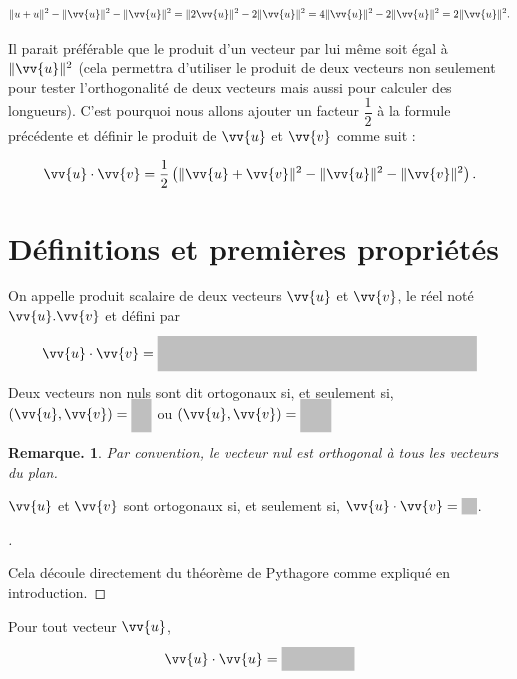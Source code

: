 \documentclass[12pt]{article}
\theoremstyle{break}
\newtheorem*{remark}{Remarque.}
\newenvironment{demo}[1][\proofname]{%
  \begin{proof}[#1]$ $\newline
  }{%
  \end{proof}
}
\begin{document}
$$
\|u+u\|^{2}-\|\vv{u}\|^{2}-\|\vv{u}\|^{2}=\|2 \vv{u}\|^{2}-2\|\vv{u}\|^{2}=4\|\vv{u}\|^{2}-2\|\vv{u}\|^{2}=2\|\vv{u}\|^{2} .
$$

Il parait préférable que le produit d'un vecteur par lui même soit égal à $\|\vv{u}\|^{2}$ (cela permettra d'utiliser le produit de deux vecteurs non seulement pour tester l'orthogonalité de deux vecteurs mais aussi pour calculer des longueurs). C'est pourquoi nous allons ajouter un facteur $\dfrac{1}{2}$ à la formule précédente et définir le produit de $\vv{u}$ et $\vv{v}$ comme suit :

$$
\vv{u} \cdot \vv{v}=\dfrac{1}{2}\left(\|\vv{u}+\vv{v}\|^{2}-\|\vv{u}\|^{2}-\|\vv{v}\|^{2}\right) .
$$

\newpage

\section{Définitions et premières propriétés}
\begin{definition}{}{}
  On appelle produit scalaire de deux vecteurs $\vv{u}$ et $\vv{v}$, le réel noté $\vv{u} . \vv{v}$ et défini par

  $$
  \vv{u} \cdot \vv{v}=\hideM{\dfrac{1}{2}\left(\|\vv{u}+\vv{v}\|^{2}-\|\vv{u}\|^{2}-\|\vv{v}\|^{2}\right)}
  $$
\end{definition}

\begin{definition}{}{}
  Deux vecteurs non nuls sont dit ortogonaux si, et seulement si, $(\vv{u}, \vv{v})=\hideM{\dfrac{\pi}{2}}$ ou $(\vv{u}, \vv{v})=\hideM{-\dfrac{\pi}{2}}$
\end{definition}

\begin{remark}
  Par convention, le vecteur nul est orthogonal à tous les vecteurs du plan.
\end{remark}

\begin{proposition}{}{}
  $\vv{u}$ et $\vv{v}$ sont ortogonaux si, et seulement si, $\vv{u} \cdot \vv{v}=\hideM{0}$.
\end{proposition}

\begin{demo}
  Cela découle directement du théorème de Pythagore comme expliqué en introduction.
\end{demo}

\begin{proposition}{}{}
  Pour tout vecteur $\vv{u}$,

  $$
  \vv{u} \cdot \vv{u}=\hideM{\|\vv{u}\|^{2}}
  $$
\end{proposition}
\end{document}
